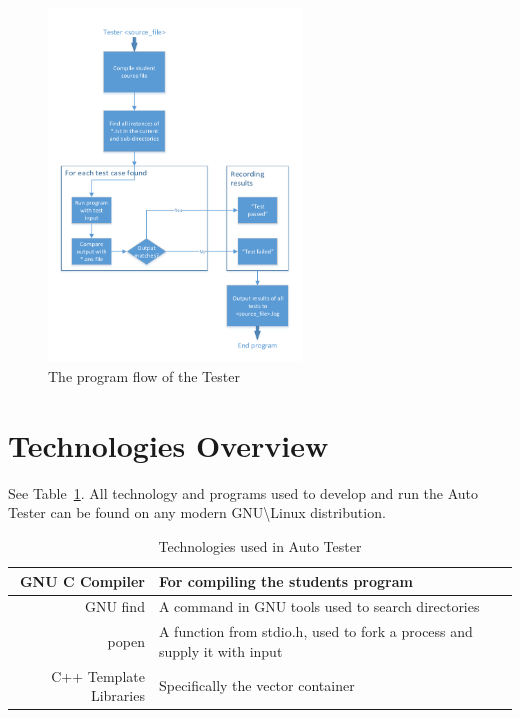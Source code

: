 \begin{figure}[tbh]
\begin{center}
\includegraphics[width=0.60\textwidth]{./Tester}
\end{center}
\caption{The program flow of the Tester \label{systemdiagram}}
\end{figure}

\section{Technologies Overview}
See Table~\ref{somenumbers}. All technology and programs used to develop and run the Auto Tester can be found on any modern GNU\textbackslash Linux distribution.

\begin{table}[tbh]
\begin{center}
\begin{tabular}{|r|l|}
\hline
    GNU C Compiler & For compiling the students program \\ \hline
    GNU find & A command in GNU tools used to search directories \\ \hline
    popen & A function from stdio.h, used to fork a process and supply it with input \\
    \hline
    C++ Template Libraries & Specifically the vector container \\
    \hline
\end{tabular}
\caption{Technologies used in Auto Tester \label{somenumbers}}
\end{center}
\end{table}

